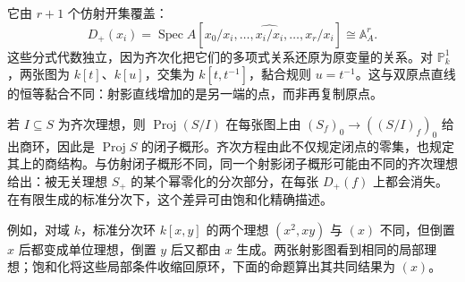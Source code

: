 它由 \(r+1\) 个仿射开集覆盖：
\[
	D_+(x_i)=\operatorname{Spec} A[x_0/x_i,\ldots,\widehat{x_i/x_i},\ldots,x_r/x_i] \cong\mathbb A_A^r.
\]
这些分式代数独立，因为齐次化把它们的多项式关系还原为原变量的关系。对 \(\mathbb P_k^1\)，两张图为 \(k[t]\)、\(k[u]\)，交集为 \(k[t,t^{-1}]\)，黏合规则 \(u=t^{-1}\)。这与双原点直线的恒等黏合不同：射影直线增加的是另一端的点，而非再复制原点。

\ProseParagraphBreak
若 \(I\subseteq S\) 为齐次理想，则 \(\operatorname{Proj}(S/I)\) 在每张图上由 \((S_f)_0\rightarrow((S/I)_f)_0\) 给出商环，因此是 \(\operatorname{Proj}S\) 的闭子概形。齐次方程由此不仅规定闭点的零集，也规定其上的商结构。与仿射闭子概形不同，同一个射影闭子概形可能由不同的齐次理想给出：被无关理想 \(S_+\) 的某个幂零化的分次部分，在每张 \(D_+(f)\) 上都会消失。在有限生成的标准分次下，这个差异可由饱和化精确描述。

\ProseParagraphBreak
例如，对域 \(k\)，标准分次环 \(k[x,y]\) 的两个理想 \((x^2,xy)\) 与 \((x)\) 不同，但倒置 \(x\) 后都变成单位理想，倒置 \(y\) 后又都由 \(x\) 生成。两张射影图看到相同的局部理想；饱和化将这些局部条件收缩回原环，下面的命题算出其共同结果为 \((x)\)。

